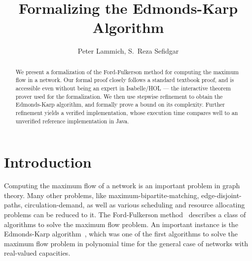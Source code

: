 \documentclass{llncs}
\begin{document}
\title{Formalizing the Edmonds-Karp Algorithm}

\author{Peter Lammich, S.~Reza Sefidgar}


\maketitle
\begin{abstract}
We present a formalization of the Ford-Fulkerson method for computing the maximum flow in a network.
Our formal proof closely follows a standard textbook proof, and is accessible even without being
an expert in Isabelle/HOL --- the interactive theorem prover used for the formalization.
We then use stepwise refinement to obtain the Edmonds-Karp algorithm, and formally prove a bound on its complexity.
Further refinement yields a verified implementation, whose execution time compares well to an unverified reference implementation in Java.



% 
% 
\end{abstract}

\section{Introduction}
Computing the maximum flow of a network is an important problem in graph theory.
Many other problems, like maximum-bipartite-matching, edge-disjoint-paths, circulation-demand, as well as various scheduling and resource allocating problems can be reduced to it.
The Ford-Fulkerson method~\cite{FF56} describes a class of algorithms to solve the maximum flow problem. An important instance is the Edmonds-Karp algorithm~\cite{EK72},
which was one of the first algorithms to solve the maximum flow problem in polynomial time for the general case of networks with real-valued capacities.
\end{document}
